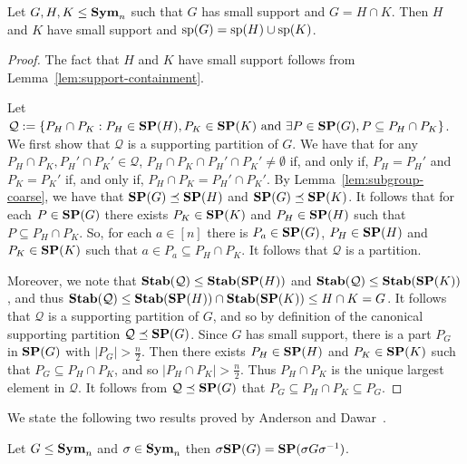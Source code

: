\documentclass[../main/thesis.tex]{subfiles}
\begin{document}
\begin{lem}
  Let $G, H, K \leq \text{\textbf{Sym}}_n$ such that $G$ has small support and $G = H \cap K$.
  Then $H$ and $K$ have small support and $\text{sp}(G) = \text{sp}(H) \cup
  \text{sp}(K)$.
  \label{lem:row-column-supports-well-behaved}
\end{lem}
\begin{proof}
  The fact that $H$ and $K$ have small support follows from
  Lemma~\ref{lem:support-containment}.

  Let $\mathcal{Q} := \{P_H \cap P_K : P_H \in \text{\textbf{SP}}(H), P_K \in \text{\textbf{SP}}(K) \text{ and
  } \exists P \in \text{\textbf{SP}}(G), P \subseteq P_H \cap P_K \} $. We first show that
  $\mathcal{Q}$ is a supporting partition of $G$. We have that for any $P_H \cap
  P_K, P_H' \cap P_K' \in \mathcal{Q}$, $P_H \cap P_K \cap P_H' \cap P_K' \neq
  \emptyset$ if, and only if, $P_H = P_H'$ and $P_K = P_K'$ if, and only if,
  $P_H \cap P_K = P_H' \cap P_K'$. By Lemma~\ref{lem:subgroup-coarse}, we have
  that $\text{\textbf{SP}}(G) \preceq \text{\textbf{SP}}(H)$ and $\text{\textbf{SP}}(G) \preceq \text{\textbf{SP}}(K)$. It follows that for
  each $P \in \text{\textbf{SP}}(G)$ there exists $P_K \in \text{\textbf{SP}}(K)$ and $P_H \in \text{\textbf{SP}}(H)$ such
  that $P \subseteq P_H \cap P_K$. So, for each $a \in [n]$ there is $P_a \in
  \text{\textbf{SP}}(G)$, $P_H \in \text{\textbf{SP}}(H)$ and $P_K \in \text{\textbf{SP}}(K)$ such that $a \in P_a \subseteq
  P_H \cap P_K$. It follows that $\mathcal{Q}$ is a partition.

  Moreover, we note that $\text{\textbf{Stab}}(\mathcal{Q}) \leq \text{\textbf{Stab}}(\text{\textbf{SP}}(H))$ and
  $\text{\textbf{Stab}}(\mathcal{Q}) \leq \text{\textbf{Stab}}(\text{\textbf{SP}}(K))$, and thus $\text{\textbf{Stab}}(\mathcal{Q}) \leq
  \text{\textbf{Stab}}(\text{\textbf{SP}}(H)) \cap \text{\textbf{Stab}}(\text{\textbf{SP}}(K)) \leq H \cap K = G$. It follows that
  $\mathcal{Q}$ is a supporting partition of $G$, and so by definition of the
  canonical supporting partition $\mathcal{Q} \preceq \text{\textbf{SP}} (G)$. Since $G$ has
  small support, there is a part $P_G$ in $\text{\textbf{SP}}(G)$ with $|P_G| > \frac{n}{2}$.
  Then there exists $P_H \in \text{\textbf{SP}}(H)$ and $P_K \in \text{\textbf{SP}}(K)$ such that $P_G
  \subseteq P_H \cap P_K$, and so $\vert P_H \cap P_K \vert > \frac{n}{2}$. Thus
  $P_H \cap P_K$ is the unique largest element in $\mathcal{Q}$. It follows from
  $\mathcal{Q} \preceq \text{\textbf{SP}}(G)$ that $P_G \subseteq P_H \cap P_K \subseteq P_G$.
\end{proof}

We state the following two results proved by Anderson and
Dawar~\cite{AndersonD17}.

\begin{lem}
  \label{lem:SP-conjugation}
  Let $G \leq \text{\textbf{Sym}}_n$ and $\sigma \in \text{\textbf{Sym}}_n$ then $\sigma \text{\textbf{SP}} (G) = \text{\textbf{SP}}(\sigma
  G \sigma^{-1})$.
\end{lem}
\end{document}
